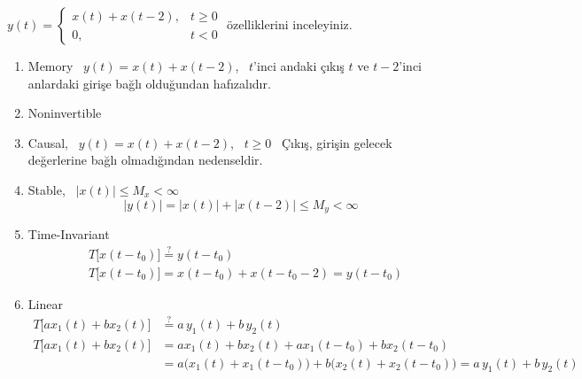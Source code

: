 \documentclass[11pt,a4paper]{article}
\begin{document}
\begin{ornek}[(Ex)]
$y(t) = \begin{cases} x(t) + x(t-2), & t \geq 0 \\ 0, & t < 0 \end{cases}$ \qquad özelliklerini inceleyiniz.
\end{ornek}
\begin{cozum}
\begin{enumerate}[label=\arabic*)]
  \item Memory \ $y(t) = x(t) + x(t-2)$, \ $t$'inci andaki çıkış $t$ ve $t-2$'inci anlardaki girişe bağlı olduğundan hafızalıdır.
  \item Noninvertible
  \item Causal, \ $y(t) = x(t) + x(t-2)$, \ $t \geq 0$ \ Çıkış, girişin gelecek değerlerine bağlı olmadığından nedenseldir.
  \item Stable, \ $|x(t)| \leq M_x < \infty$
  \[ |y(t)| = |x(t)| + |x(t-2)| \leq M_y < \infty \]
  \item Time-Invariant
  \begin{align*}
    &T\bigl[x(t-t_0)\bigr] \overset{?}{=} y(t-t_0) \\
    &T\bigl[x(t-t_0)\bigr] = x(t-t_0) + x(t-t_0-2) = y(t-t_0)
  \end{align*}
  \item Linear\footnotemark
  \[ \begin{aligned}
    T\bigl[a x_1(t) + b x_2(t)\bigr] &\overset{?}{=} a\,y_1(t) + b\,y_2(t) \\
    T\bigl[a x_1(t) + b x_2(t)\bigr] &= a x_1(t) + b x_2(t) + a x_1(t-t_0) + b x_2(t-t_0) \\
    &= a\bigl(x_1(t) + x_1(t-t_0)\bigr) + b\bigl(x_2(t) + x_2(t-t_0)\bigr) = a\,y_1(t) + b\,y_2(t)
  \end{aligned} \]
\end{enumerate}
\end{cozum}
\end{document}
